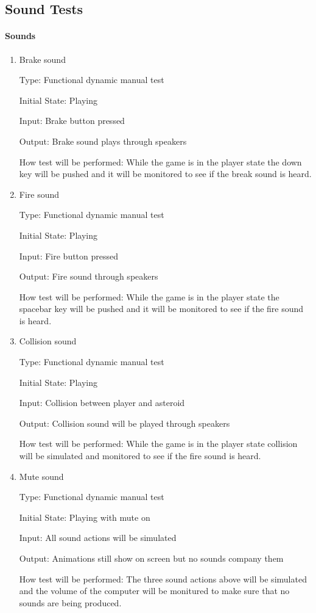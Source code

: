 \documentclass[12pt, titlepage]{article}
\begin{document}
\subsection{Sound Tests}

\paragraph{Sounds}

\begin{enumerate}
\item{Brake sound\\}

Type: Functional dynamic manual test

Initial State: Playing

Input: Brake button pressed

Output: Brake sound plays through speakers

How test will be performed: While the game is in the player state the down key will be pushed and it will be monitored to see if the break sound is heard.

\item{Fire sound\\}

Type: Functional dynamic manual test

Initial State: Playing

Input: Fire button pressed

Output: Fire sound through speakers

How test will be performed: While the game is in the player state the spacebar key will be pushed and it will be monitored to see if the fire sound is heard.

\item{Collision sound\\}

Type: Functional dynamic manual test

Initial State: Playing

Input: Collision between player and asteroid

Output: Collision sound will be played through speakers

How test will be performed: While the game is in the player state collision will be simulated and monitored to see if the fire sound is heard.

\item{Mute sound\\}

Type: Functional dynamic manual test

Initial State: Playing with mute on

Input: All sound actions will be simulated

Output: Animations still show on screen but no sounds company them

How test will be performed: The three sound actions above will be simulated and the volume of the computer will be monitured to make sure that no sounds are being produced.

\end{enumerate}
\end{document}
